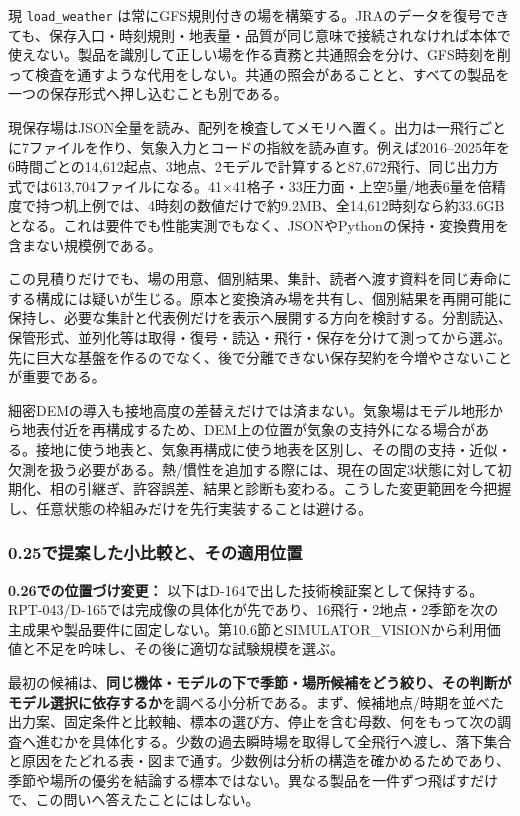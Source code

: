 \documentclass[11pt,a4paper]{article}
\begin{document}
現 \texttt{load\_weather}
は常にGFS規則付きの場を構築する。JRAのデータを復号できても、保存入口・時刻規則・地表量・品質が同じ意味で接続されなければ本体で使えない。製品を識別して正しい場を作る責務と共通照会を分け、GFS時刻を削って検査を通すような代用をしない。共通の照会があることと、すべての製品を一つの保存形式へ押し込むことも別である。

現保存場はJSON全量を読み、配列を検査してメモリへ置く。出力は一飛行ごとに7ファイルを作り、気象入力とコードの指紋を読み直す。例えば2016--2025年を6時間ごとの14,612起点、3地点、2モデルで計算すると87,672飛行、同じ出力方式では613,704ファイルになる。41×41格子・33圧力面・上空5量/地表6量を倍精度で持つ机上例では、4時刻の数値だけで約9.2MB、全14,612時刻なら約33.6GBとなる。これは要件でも性能実測でもなく、JSONやPythonの保持・変換費用を含まない規模例である。

この見積りだけでも、場の用意、個別結果、集計、読者へ渡す資料を同じ寿命にする構成には疑いが生じる。原本と変換済み場を共有し、個別結果を再開可能に保持し、必要な集計と代表例だけを表示へ展開する方向を検討する。分割読込、保管形式、並列化等は取得・復号・読込・飛行・保存を分けて測ってから選ぶ。先に巨大な基盤を作るのでなく、後で分離できない保存契約を今増やさないことが重要である。

細密DEMの導入も接地高度の差替えだけでは済まない。気象場はモデル地形から地表付近を再構成するため、DEM上の位置が気象の支持外になる場合がある。接地に使う地表と、気象再構成に使う地表を区別し、その間の支持・近似・欠測を扱う必要がある。熱/慣性を追加する際には、現在の固定3状態に対して初期化、相の引継ぎ、許容誤差、結果と診断も変わる。こうした変更範囲を今把握し、任意状態の枠組みだけを先行実装することは避ける。

\subsubsection{0.25で提案した小比較と、その適用位置}\label{ux3067ux63d0ux6848ux3057ux305fux5c0fux6bd4ux8f03ux3068ux305dux306eux9069ux7528ux4f4dux7f6e}

\textbf{0.26での位置づけ変更：}
以下はD-164で出した技術検証案として保持する。RPT-043/D-165では完成像の具体化が先であり、16飛行・2地点・2季節を次の主成果や製品要件に固定しない。第10.6節とSIMULATOR\_VISIONから利用価値と不足を吟味し、その後に適切な試験規模を選ぶ。

最初の候補は、\textbf{同じ機体・モデルの下で季節・場所候補をどう絞り、その判断がモデル選択に依存するか}を調べる小分析である。まず、候補地点/時期を並べた出力案、固定条件と比較軸、標本の選び方、停止を含む母数、何をもって次の調査へ進むかを具体化する。少数の過去瞬時場を取得して全飛行へ渡し、落下集合と原因をたどれる表・図まで通す。少数例は分析の構造を確かめるためであり、季節や場所の優劣を結論する標本ではない。異なる製品を一件ずつ飛ばすだけで、この問いへ答えたことにはしない。
\end{document}
